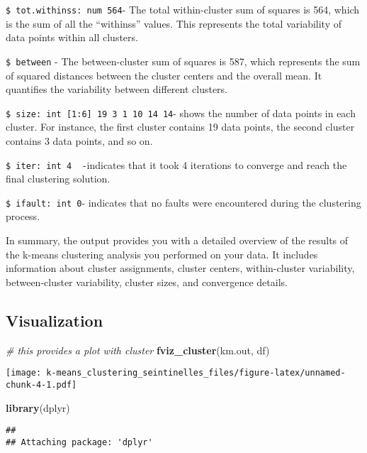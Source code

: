 \documentclass[
]{article}
\newenvironment{Shaded}{\begin{snugshade}}{\end{snugshade}}
\newcommand{\CommentTok}[1]{\textcolor[rgb]{0.56,0.35,0.01}{\textit{#1}}}
\newcommand{\FunctionTok}[1]{\textcolor[rgb]{0.13,0.29,0.53}{\textbf{#1}}}
\newcommand{\NormalTok}[1]{#1}
\begin{document}
\texttt{\$\ tot.withinss:\ num\ 564}- The total within-cluster sum of
squares is 564, which is the sum of all the ``withinss'' values. This
represents the total variability of data points within all clusters.

\texttt{\$\ between} - The between-cluster sum of squares is 587, which
represents the sum of squared distances between the cluster centers and
the overall mean. It quantifies the variability between different
clusters.

\texttt{\$\ size:\ int\ {[}1:6{]}\ 19\ 3\ 1\ 10\ 14\ 14}- shows the
number of data points in each cluster. For instance, the first cluster
contains 19 data points, the second cluster contains 3 data points, and
so on.

\texttt{\$\ iter:\ int\ 4\ \ -}indicates that it took 4 iterations to
converge and reach the final clustering solution.

\texttt{\$\ ifault:\ int\ 0}- indicates that no faults were encountered
during the clustering process.

In summary, the output provides you with a detailed overview of the
results of the k-means clustering analysis you performed on your data.
It includes information about cluster assignments, cluster centers,
within-cluster variability, between-cluster variability, cluster sizes,
and convergence details.

\hypertarget{visualization}{%
\subsection{Visualization}\label{visualization}}

\begin{Shaded}
\begin{Highlighting}[]
\CommentTok{\# this provides a plot with cluster}
\FunctionTok{fviz\_cluster}\NormalTok{(km.out, df)}
\end{Highlighting}
\end{Shaded}

\texttt{[image: k-means\_clustering\_seintinelles\_files/figure-latex/unnamed-chunk-4-1.pdf]}

\begin{Shaded}
\begin{Highlighting}[]
\FunctionTok{library}\NormalTok{(dplyr)}
\end{Highlighting}
\end{Shaded}

\begin{verbatim}
## 
## Attaching package: 'dplyr'
\end{verbatim}
\end{document}
